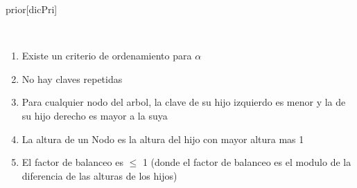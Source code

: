 \begin{Representacion}

	\begin{Estructura}{prior}[dicPri]
		\begin{Tupla}[dicPri]
		\end{Tupla}

		~ 

		\begin{Tupla}[Nodo]
		\end{Tupla}
	\end{Estructura}


	\begin{enumerate}

		\item Existe un criterio de ordenamiento para $\alpha$ %
		
		\item No hay claves repetidas

		\item Para cualquier nodo del arbol, la clave de su hijo izquierdo es menor y la de su hijo derecho es mayor a la suya

		\item La altura de un Nodo es la altura del hijo con mayor altura mas 1

		\item El factor de balanceo es $\leq$ 1 (donde el factor de balanceo es el modulo de la diferencia de las alturas de los hijos)


	\end{enumerate}
	


\end{Representacion}
